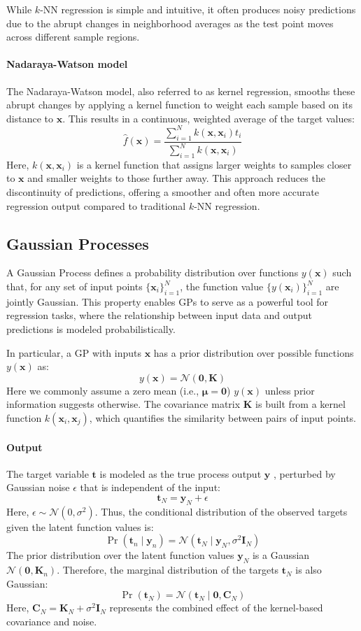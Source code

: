 While $k$-NN regression is simple and intuitive, it often produces noisy predictions due to the abrupt changes in neighborhood averages as the test point moves across different sample regions.

\paragraph*{Nadaraya-Watson model}
The Nadaraya-Watson model, also referred to as kernel regression, smooths these abrupt changes by applying a kernel function to weight each sample based on its distance to $\mathbf{x}$. 
This results in a continuous, weighted average of the target values:
\[\hat{f}(\mathbf{x})=\dfrac{\sum_{i=1}^N k(\mathbf{x},\mathbf{x}_i)t_i}{\sum_{i=1}^N k(\mathbf{x},\mathbf{x}_i)}\]
Here, $k(\mathbf{x},\mathbf{x}_i)$ is a kernel function that assigns larger weights to samples closer to $\mathbf{x}$ and smaller weights to those further away.
This approach reduces the discontinuity of predictions, offering a smoother and often more accurate regression output compared to traditional $k$-NN regression.

\subsection{Gaussian Processes}
A Gaussian Process defines a probability distribution over functions $y(\mathbf{x})$  such that, for any set of input points $\{\mathbf{x}_i\}_{i=1}^{N}$, the function value $\{y(\mathbf{x}_i)\}_{i=1}^{N}$ are jointly Gaussian.
This property enables GPs to serve as a powerful tool for regression tasks, where the relationship between input data and output predictions is modeled probabilistically.
 
In particular, a GP with inputs $\mathbf{x}$ has a prior distribution over possible functions $y(\mathbf{x})$ as:
\[y(\mathbf{x})=\mathcal{N}(\mathbf{0},\mathbf{K})\]
Here we commonly assume a zero mean (i.e., $\boldsymbol{\mu}=\mathbf{0}$) $y(\mathbf{x})$ unless prior information suggests otherwise.
The covariance matrix $\mathbf{K}$ is built from a kernel function $k(\mathbf{x}_i,\mathbf{x}_j)$, which quantifies the similarity between pairs of input points.  

\paragraph*{Output}
The target variable $\mathbf{t}$ is modeled as the true process output $\mathbf{y}$ , perturbed by Gaussian noise $\epsilon$ that is independent of the input:
\[\mathbf{t}_N=\mathbf{y}_N+\epsilon\]
Here, $\epsilon\sim\mathcal{N}(0,\sigma^2)$. 
Thus, the conditional distribution of the observed targets given the latent function values is:
\[\Pr(\mathbf{t}_n\mid\mathbf{y}_n)=\mathcal{N}(\mathbf{t}_N\mid\mathbf{y}_N,\sigma^2\mathbf{I}_N)\]
The prior distribution over the latent function values $\mathbf{y}_N$ is a Gaussian $\mathcal{N}(\mathbf{0},\mathbf{K}_n)$. 
Therefore, the marginal distribution of the targets $\mathbf{t}_N$ is also Gaussian:
\[\Pr(\mathbf{t}_N)=\mathcal{N}(\mathbf{t}_N\mid\mathbf{0},\mathbf{C}_N)\]
Here, $\mathbf{C}_N=\mathbf{K}_N+\sigma^2\mathbf{I}_N$ represents the combined effect of the kernel-based covariance and noise.

